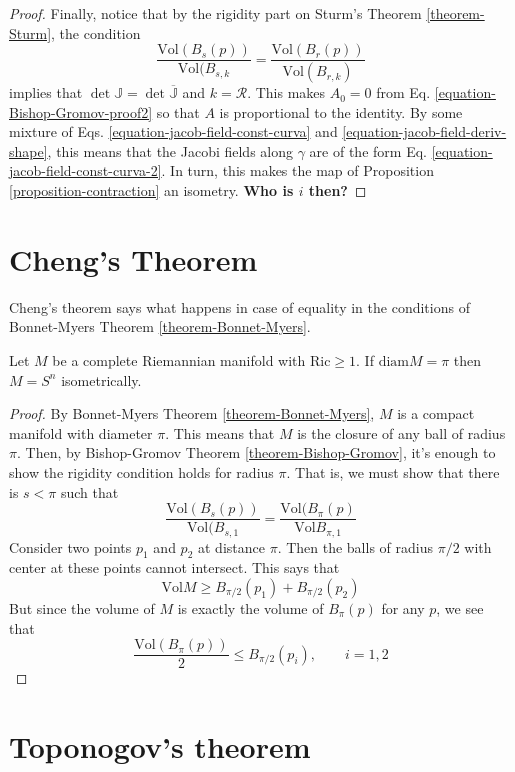 \begin{proof}
Finally, notice that by the rigidity part on
Sturm's Theorem
\ref{theorem-Sturm}, the condition
$$
\frac{\text{Vol}(B_s(p))}{\text{Vol}(B_{s,k}}
=
\frac{\text{Vol}(B_r(p))}{\text{Vol}(B_{r,k})
}
$$
implies that
$\det\mathbb{J}=\det\overline{\mathbb{J}}$
and $k=\mathcal{R}$.
This makes $A_0=0$ from Eq.
\ref{equation-Bishop-Gromov-proof2} so that
$A$ is
proportional to the identity. By some mixture
of Eqs.
\ref{equation-jacob-field-const-curva}
and
\ref{equation-jacob-field-deriv-shape}, this
means that the
Jacobi fields along $\gamma$ are of the form
Eq.
\ref{equation-jacob-field-const-curva-2}. In
turn, this makes the map
of Proposition \ref{proposition-contraction}
an isometry. {\bf Who is $i$ then?}
\end{proof}

\section{Cheng's Theorem}
\label{section-Cheng-theorem}

Cheng's theorem says what happens in case of
equality in the conditions of
Bonnet-Myers Theorem
\ref{theorem-Bonnet-Myers}.
\begin{theorem}[Cheng]
\label{theorem-Cheng}
Let $M$ be a complete Riemannian manifold
with $\text{Ric}\geq 1$. If
$\text{diam}M=\pi$ then $M=S^n$
isometrically.
\end{theorem}

\begin{proof}
By Bonnet-Myers Theorem
\ref{theorem-Bonnet-Myers}, $M$ is a compact
manifold
with diameter $\pi$. This means that $M$ is
the closure of any ball of radius
$\pi$. Then, by Bishop-Gromov Theorem
\ref{theorem-Bishop-Gromov}, it's enough
to show the rigidity condition holds for
radius $\pi$. That is, we must show
that there is $s<\pi$ such that
$$
\frac{\text{Vol}(B_s(p))}{\text{Vol}(B_{s,1}}
=
\frac{\text{Vol}(B_\pi(p)}{\text{Vol}B_{\pi,
1}}
$$
Consider two points $p_1$ and $p_2$ at
distance $\pi$. Then the balls of radius
$\pi/2$ with center at these points cannot
intersect. This says that
$$
\text{Vol}M\geq B_{\pi/2}(p_1)+B_{\pi/2}(p_2)
$$
But since the volume of $M$ is exactly the
volume of $B_\pi(p)$ for any $p$, we
see that
$$
\frac{\text{Vol}(B_\pi(p))}{2}\leq
B_{\pi/2}(p_i),\qquad i=1,2
$$
\end{proof}

\section{Toponogov's theorem}
\label{section-Toponogov}

